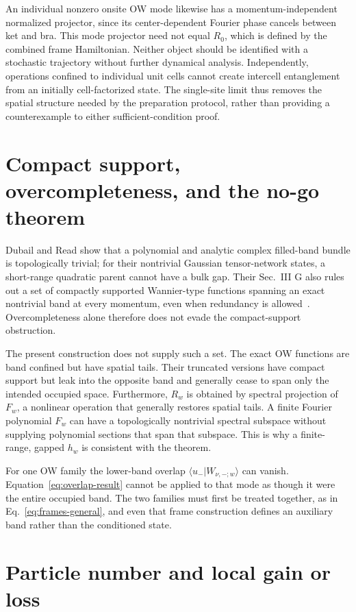 \documentclass[aps,prb,onecolumn,nofootinbib,superscriptaddress]{revtex4-2}
\begin{document}
An individual nonzero onsite OW mode likewise has a momentum-independent normalized projector, since its center-dependent Fourier phase cancels between ket and bra. This mode projector need not equal $R_0$, which is defined by the combined frame Hamiltonian. Neither object should be identified with a stochastic trajectory without further dynamical analysis. Independently, operations confined to individual unit cells cannot create intercell entanglement from an initially cell-factorized state. The single-site limit thus removes the spatial structure needed by the preparation protocol, rather than providing a counterexample to either sufficient-condition proof.

\section{Compact support, overcompleteness, and the no-go theorem}

Dubail and Read show that a polynomial and analytic complex filled-band bundle is topologically trivial; for their nontrivial Gaussian tensor-network states, a short-range quadratic parent cannot have a bulk gap. Their Sec.~III G also rules out a set of compactly supported Wannier-type functions spanning an exact nontrivial band at every momentum, even when redundancy is allowed~\cite{DubailRead2015}. Overcompleteness alone therefore does not evade the compact-support obstruction.

The present construction does not supply such a set. The exact OW functions are band confined but have spatial tails. Their truncated versions have compact support but leak into the opposite band and generally cease to span only the intended occupied space. Furthermore, $R_w$ is obtained by spectral projection of $F_w$, a nonlinear operation that generally restores spatial tails. A finite Fourier polynomial $F_w$ can have a topologically nontrivial spectral subspace without supplying polynomial sections that span that subspace. This is why a finite-range, gapped $h_w$ is consistent with the theorem.

For one OW family the lower-band overlap $\langle u_-|W_{\nu,-;w}\rangle$ can vanish. Equation~\eqref{eq:overlap-result} cannot be applied to that mode as though it were the entire occupied band. The two families must first be treated together, as in Eq.~\eqref{eq:frames-general}, and even that frame construction defines an auxiliary band rather than the conditioned state.

\section{Particle number and local gain or loss}
\end{document}
